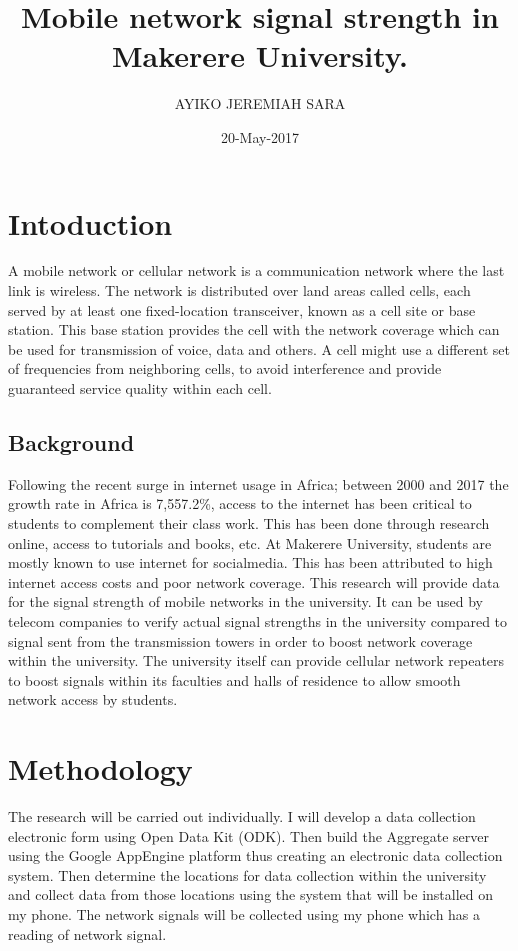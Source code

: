 \documentclass{article}
\begin{document}
\title{Mobile network signal strength in Makerere University.}
\date{20-May-2017}

\author{AYIKO JEREMIAH SARA}


\maketitle
\newpage

\section{Intoduction}
A mobile network or cellular network is a communication network where the last link is wireless. The network is distributed over land areas called cells, each served by at least one fixed-location transceiver, known as a cell site or base station. This base station provides the cell with the network coverage which can be used for transmission of voice, data and others. A cell might use a different set of frequencies from neighboring cells, to avoid interference and provide guaranteed service quality within each cell.\cite{key:1}

\subsection{Background}
Following the recent surge in internet usage in Africa; between 2000 and 2017 the growth rate in Africa is 7,557.2\%\cite{key:2}, access to the internet has been critical to students to complement their class work. This has been done through research online, access to tutorials and books, etc. At Makerere University, students are mostly known to use internet for socialmedia. This has been attributed to high internet access costs and poor network coverage. This research will provide data for the signal strength of mobile networks in the university. It can be used by telecom companies to verify actual signal strengths in the university compared to signal sent from the transmission towers in order to boost network coverage within the university. The university itself can provide cellular network repeaters to boost signals within its faculties and halls of residence to allow smooth network access by students.

\section{Methodology}
The research will be carried out individually. I will develop a data collection electronic form using Open Data Kit (ODK). Then build the Aggregate server using the Google AppEngine platform thus creating an electronic data collection system. Then determine the locations for data collection within the university and collect data from those locations using the system that will be installed on my phone. The network signals will be collected using my phone which has a reading of network signal.
\end{document}
